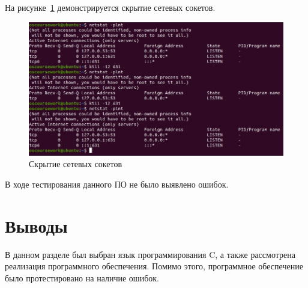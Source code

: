 На рисунке~\ref{img:net_hide} демонстрируется скрытие сетевых сокетов.
\begin{figure}[H]
    \centering
    \includegraphics[scale=0.45]{images/scr_03.jpg}
    \caption{Скрытие сетевых сокетов}\label{img:net_hide}
\end{figure}

В ходе тестирования данного ПО не было выявлено ошибок.

\section{Выводы}%
\label{sec:vyvody}

В данном разделе был выбран язык программирования C, а также рассмотрена реализация программного обеспечения. Помимо этого, программное обеспечение было протестировано на наличие ошибок.
